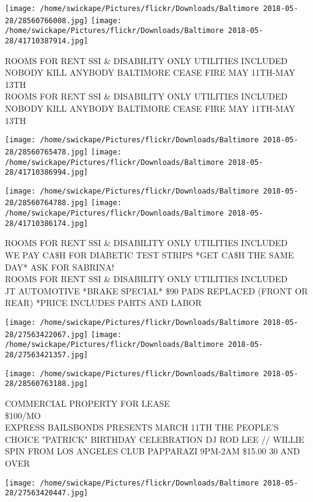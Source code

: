 \documentclass[10pt,letterpaper]{article}
\begin{document}
\vspace{0.25in}
\texttt{[image: /home/swickape/Pictures/flickr/Downloads/Baltimore 2018-05-28/28560766008.jpg]}
\texttt{[image: /home/swickape/Pictures/flickr/Downloads/Baltimore 2018-05-28/41710387914.jpg]}

ROOMS FOR RENT SSI \& DISABILITY ONLY UTILITIES INCLUDED\\
NOBODY KILL ANYBODY BALTIMORE CEASE FIRE MAY 11TH{-}MAY 13TH\\
ROOMS FOR RENT SSI \& DISABILITY ONLY UTILITIES INCLUDED NOBODY KILL ANYBODY BALTIMORE CEASE FIRE MAY 11TH{-}MAY 13TH\\
\pagebreak

\texttt{[image: /home/swickape/Pictures/flickr/Downloads/Baltimore 2018-05-28/28560765478.jpg]}
\texttt{[image: /home/swickape/Pictures/flickr/Downloads/Baltimore 2018-05-28/41710386994.jpg]}

\texttt{[image: /home/swickape/Pictures/flickr/Downloads/Baltimore 2018-05-28/28560764788.jpg]}
\texttt{[image: /home/swickape/Pictures/flickr/Downloads/Baltimore 2018-05-28/41710386174.jpg]}

ROOMS FOR RENT SSI \& DISABILITY ONLY UTILITIES INCLUDED\\
WE PAY CA\$H FOR DIABETIC TEST STRIPS *GET CA\$H THE SAME DAY* ASK FOR SABRINA!\\
ROOMS FOR RENT SSI \& DISABILITY ONLY UTILITIES INCLUDED\\
JT AUTOMOTIVE *BRAKE SPECIAL* \$90 PADS REPLACED (FRONT OR REAR) *PRICE INCLUDES PARTS AND LABOR\\
\pagebreak

\texttt{[image: /home/swickape/Pictures/flickr/Downloads/Baltimore 2018-05-28/27563422067.jpg]}
\texttt{[image: /home/swickape/Pictures/flickr/Downloads/Baltimore 2018-05-28/27563421357.jpg]}

\texttt{[image: /home/swickape/Pictures/flickr/Downloads/Baltimore 2018-05-28/28560763188.jpg]}

COMMERCIAL PROPERTY FOR LEASE\\
\$100/MO\\
EXPRESS BAILSBONDS PRESENTS MARCH 11TH THE PEOPLE'S CHOICE "PATRICK" BIRTHDAY CELEBRATION DJ ROD LEE // WILLIE SPIN FROM LOS ANGELES CLUB PAPPARAZI 9PM{-}2AM \$15.00 30 AND OVER\\
\pagebreak

\texttt{[image: /home/swickape/Pictures/flickr/Downloads/Baltimore 2018-05-28/27563420447.jpg]}
\end{document}
